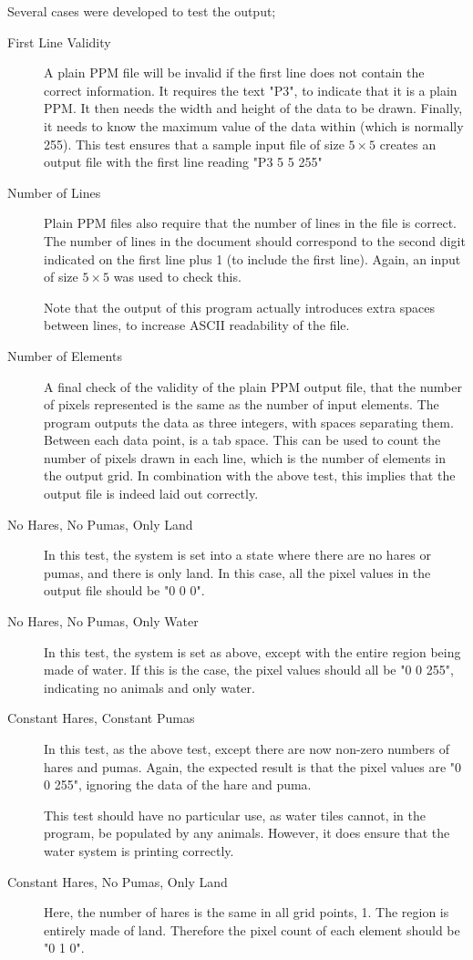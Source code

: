 	Several cases were developed to test the output;
	\begin{description}
		\item[First Line Validity]
			A plain PPM file will be invalid if the first line does not contain the correct information.
			It requires the text "P3", to indicate that it is a plain PPM.
			It then needs the width and height of the data to be drawn.
			Finally, it needs to know the maximum value of the data within (which is normally 255).
			This test ensures that a sample input file of size $5\times5$ creates an output file with the first line reading "P3 5 5 255"
		\item[Number of Lines]
			Plain PPM files also require that the number of lines in the file is correct. 
			The number of lines in the document should correspond to the second digit indicated on the first line plus 1 (to include the first line).
			Again, an input of size $5\times5$ was used to check this.

			Note that the output of this program actually introduces extra spaces between lines, to increase ASCII readability of the file.
		\item[Number of Elements]
			A final check of the validity of the plain PPM output file, that the number of pixels represented is the same as the number of input elements.
			The program outputs the data as three integers, with spaces separating them.
			Between each data point, is a tab space.
			This can be used to count the number of pixels drawn in each line, which is the number of elements in the output grid.
			In combination with the above test, this implies that the output file is indeed laid out correctly.
		\item[No Hares, No Pumas, Only Land]
			In this test, the system is set into a state where there are no  hares or pumas, and there is only land.
			In this case, all the pixel values in the output file should be "0 0 0".
		\item[No Hares, No Pumas, Only Water]
			In this test, the system is set as above, except with the entire region being made of water.
			If this is the case, the pixel values should all be "0 0 255", indicating no animals and only water.
		\item[Constant Hares, Constant Pumas]
			In this test, as the above test, except there are now non-zero numbers of hares and pumas.
			Again, the expected result is that the pixel values are "0 0 255", ignoring the data of the hare and puma.

			This test should have no particular use, as water tiles cannot, in the program, be populated by any animals.
			However, it does ensure that the water system is printing correctly.
		\item[Constant Hares, No Pumas, Only Land]
			Here, the number of hares is the same in all grid points, 1.
			The region is entirely made of land.
			Therefore the pixel count of each element should be "0 1 0".
			

\end{description}
